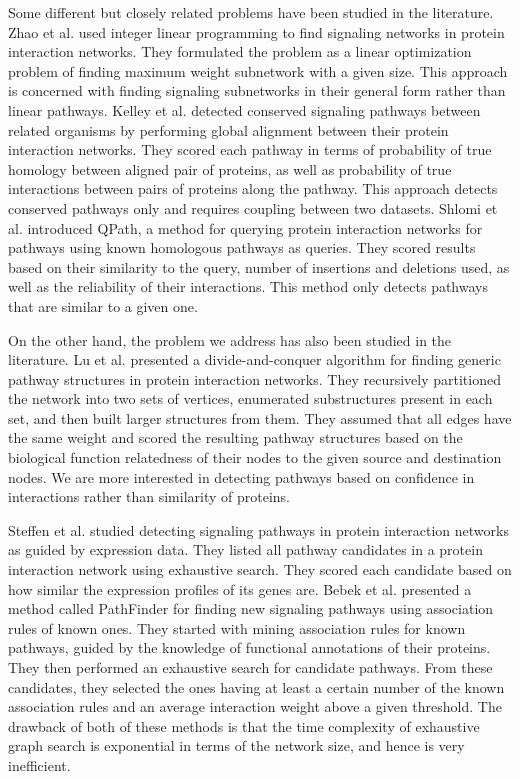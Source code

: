\documentclass{ws-procs11x85}
\begin{document}
Some different but closely related problems have been studied in the literature.
Zhao et al.\cite{zhao} used integer linear programming to find signaling networks
in protein interaction networks. They formulated the problem as a linear
optimization problem of finding maximum weight subnetwork with a given size.
This approach is concerned with finding signaling subnetworks in their general
form rather than linear pathways. Kelley et al.\cite{kelley} detected conserved
signaling pathways between related organisms by performing global alignment
between their protein interaction networks. They scored each pathway in terms
of probability of true homology between aligned pair of proteins, as well as
probability of true interactions between pairs of proteins along the pathway.
This approach detects conserved pathways only and requires coupling between two
datasets. Shlomi et al.\cite{shlomi} introduced QPath, a method for querying
protein interaction networks for pathways using known homologous pathways as
queries. They scored results based on their similarity to the query, number of
insertions and deletions used, as well as the reliability of their interactions.
This method only detects pathways that are similar to a given one.

On the other hand, the problem we address has also been studied in the
literature. Lu et al.\cite{lu} presented a divide-and-conquer algorithm for
finding generic pathway structures in protein interaction networks. They
recursively partitioned the network into two sets of vertices, enumerated
substructures present in each set, and then built larger structures from them.
They assumed that all edges have the same weight and scored the resulting
pathway structures based on the biological function relatedness of their nodes
to the given source and destination nodes. We are more interested in detecting
pathways based on confidence in interactions rather than similarity of
proteins.

Steffen et al.\cite{steffen} studied detecting signaling pathways in protein
interaction networks as guided by expression data. They listed all pathway
candidates in a protein interaction network using exhaustive search. They
scored each candidate based on how similar the expression profiles of its
genes are. Bebek et al.\cite{bebek} presented a method called PathFinder for
finding new signaling pathways using association rules of known ones. They
started with mining association rules for known pathways, guided by the
knowledge of functional annotations of their proteins. They then performed an
exhaustive search for candidate pathways. From these candidates, they selected
the ones having at least a certain number of the known association rules and an
average interaction weight above a given threshold. The drawback of both of
these methods is that the time complexity of exhaustive graph search is
exponential in terms of the network size, and hence is very inefficient.
\end{document}
